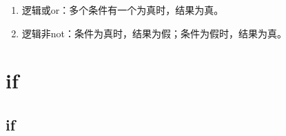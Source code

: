 \begin{enumerate}
    \item 逻辑或or：多个条件有一个为真时，结果为真。
          \begin{table}[H]
              \centering
              \caption{逻辑或}
          \end{table}

    \item 逻辑非not：条件为真时，结果为假；条件为假时，结果为真。
          \begin{table}[H]
              \centering
              \caption{逻辑非}
          \end{table}
\end{enumerate}

\newpage

\section{if}

\subsection{if}

